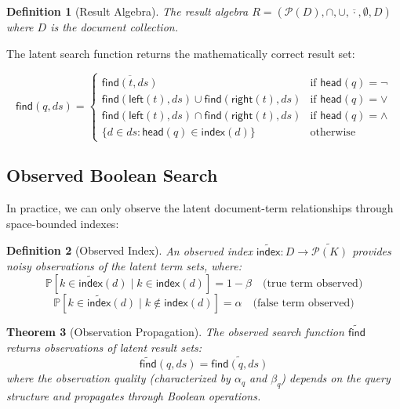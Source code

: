 \documentclass[11pt,final,hidelinks]{article}
\newtheorem{theorem}{Theorem}[section]
\newtheorem{definition}[theorem]{Definition}
\newcommand{\obs}[1]{\widetilde{#1}}  %
\newcommand{\PS}[1]{\mathcal{P}(#1)}  %
\newcommand{\SetComplement}[1]{\overline{#1}}
\newcommand{\Find}{\mathsf{find}}     %
\newcommand{\OFind}{\obs{\mathsf{find}}}  %
\newcommand{\MakeIndex}{\mathsf{index}}
\newcommand{\OMakeIndex}{\obs{\mathsf{index}}}
\newcommand{\Head}{\mathsf{head}}
\newcommand{\Left}{\mathsf{left}}
\newcommand{\Right}{\mathsf{right}}
\newcommand{\ProbCond}[2]{\mathbb{P}\left[#1 \mid #2\right]}
\newcommand{\fprate}{\alpha}
\newcommand{\fnrate}{\beta}
\begin{document}
\begin{definition}[Result Algebra]
The result algebra $R = (\PS{D}, \cap, \cup, \overline{\cdot}, \emptyset, D)$ where $D$ is the document collection.
\end{definition}

The latent search function returns the mathematically correct result set:

\begin{equation}
\Find(q, ds) = \begin{cases}
    \SetComplement{\Find(t, ds)} & \text{if } \Head(q) = \neg \\
    \Find(\Left(t), ds) \cup \Find(\Right(t), ds) & \text{if } \Head(q) = \lor \\
    \Find(\Left(t), ds) \cap \Find(\Right(t), ds) & \text{if } \Head(q) = \land \\
    \{d \in ds : \Head(q) \in \MakeIndex(d)\} & \text{otherwise}
\end{cases}
\end{equation}

\subsection{Observed Boolean Search}

In practice, we can only observe the latent document-term relationships through space-bounded indexes:

\begin{definition}[Observed Index]
An observed index $\OMakeIndex : D \to \obs{\PS{K}}$ provides noisy observations of the latent term sets, where:
\begin{equation}
\ProbCond{k \in \OMakeIndex(d)}{k \in \MakeIndex(d)} = 1 - \fnrate \quad \text{(true term observed)}
\end{equation}
\begin{equation}
\ProbCond{k \in \OMakeIndex(d)}{k \notin \MakeIndex(d)} = \fprate \quad \text{(false term observed)}
\end{equation}
\end{definition}

\begin{theorem}[Observation Propagation]
The observed search function $\OFind$ returns observations of latent result sets:
\begin{equation}
\OFind(q, ds) = \obs{\Find(q, ds)}
\end{equation}
where the observation quality (characterized by $\fprate_q$ and $\fnrate_q$) depends on the query structure and propagates through Boolean operations.
\end{theorem}
\end{document}
